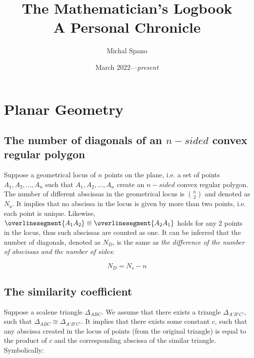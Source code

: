 \documentclass[10pt,a4paper]{article}
\title{\textbf{The Mathematician's Logbook \\ \Large A Personal Chronicle}}
\author{Michal Spano}
\date{March 2022---\textit{present}}
\begin{document}
\maketitle
\tableofcontents

\newcommand{\exercise}{\paragraph{Exercise \theexercise.}\stepcounter{exercise}}

\newpage

\section{Planar Geometry}



\subsection{The number of diagonals of an $n-sided$ convex regular polygon}

Suppose a geometrical locus of $n$ points on the plane, 
i.e. a set of points $A_1, A_2, ..., A_n$ 
such that $A_1, A_2, ..., A_n$ create an $n-sided$ convex regular polygon.
The number of different abscissas in the geometrical locus is ${n \choose 2}$ 
and denoted as $N_a$. It implies that no abscissa in the locus is given by more than two points, 
i.e. each point is unique. Likewise, $\overlinesegment{A_1A_2} \equiv \overlinesegment{A_2A_1}$ 
holds for any 2 points in the locus, thus such abscissas are counted as one. It can be inferred 
that the number of diagonals, denoted as $N_D$, is the same as \textit{the difference of the number of 
abscissas and the number of sides}: 

$$N_D = N_s - n$$

\subsection{The similarity coefficient}

Suppose a scalene triangle $\Delta_{ABC}$. We assume that there exists a triangle $\Delta_{A'B'C'}$,
such that $\Delta_{ABC} \cong \Delta_{A'B'C'}$. It implies that there exists some constant $c$,
such that any abscissa created in the locus of points (from the original triangle) is equal to the
product of $c$ and the corresponding abscissa of the similar triangle. Symbolically: 
\end{document}
